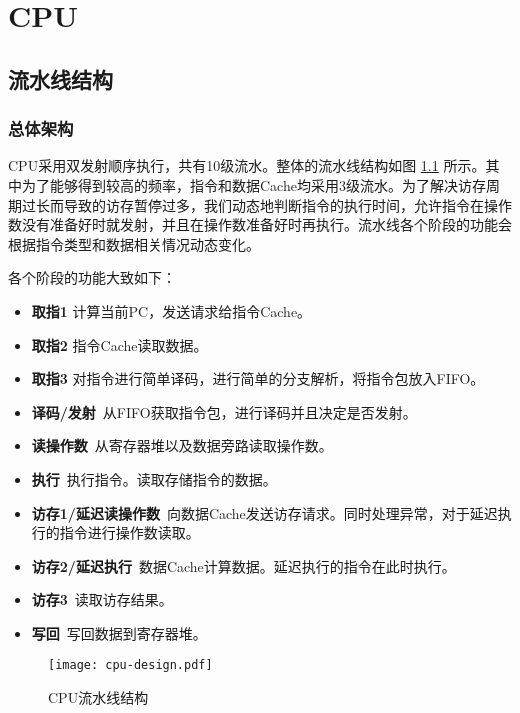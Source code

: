 \chapter{CPU}

\section{流水线结构}

\subsection{总体架构}

CPU采用双发射顺序执行，共有10级流水。整体的流水线结构如图 \ref{fig:cpu-pipeline} 所示。其中为了能够得到较高的频率，指令和数据Cache均采用3级流水。为了解决访存周期过长而导致的访存暂停过多，我们动态地判断指令的执行时间，允许指令在操作数没有准备好时就发射，并且在操作数准备好时再执行。流水线各个阶段的功能会根据指令类型和数据相关情况动态变化。

各个阶段的功能大致如下：
\begin{itemize}
    \item \textbf{取指1} 计算当前PC，发送请求给指令Cache。
    \item \textbf{取指2} 指令Cache读取数据。
    \item \textbf{取指3} 对指令进行简单译码，进行简单的分支解析，将指令包放入FIFO。
    \item \textbf{译码/发射}\, 从FIFO获取指令包，进行译码并且决定是否发射。
    \item \textbf{读操作数}\, 从寄存器堆以及数据旁路读取操作数。
    \item \textbf{执行}\, 执行指令。读取存储指令的数据。
    \item \textbf{访存1/延迟读操作数}\,  向数据Cache发送访存请求。同时处理异常，对于延迟执行的指令进行操作数读取。
    \item \textbf{访存2/延迟执行}\, 数据Cache计算数据。延迟执行的指令在此时执行。
    \item \textbf{访存3}\, 读取访存结果。
    \item \textbf{写回}\, 写回数据到寄存器堆。
\end{itemize}

\begin{landscape}
\begin{figure}[htbp]
	\centering
	\texttt{[image: cpu-design.pdf]}
	\caption{CPU流水线结构}
	\label{fig:cpu-pipeline}
\end{figure}
\end{landscape}

